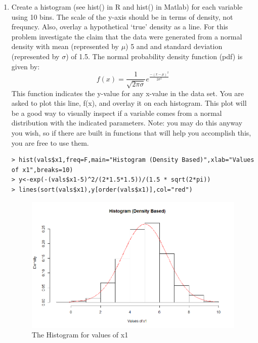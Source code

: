 \documentclass[fontsize=10pt]{scrartcl}
\begin{document}
\begin{enumerate}
\begin{verbatim}
\end{verbatim}
		
		\item
		Create a histogram (see hist() in R and hist() in Matlab) for each variable using 10 bins. The scale of the y-axis should be in terms of density, not frequncy. Also, overlay a hypothetical ‘true’ density as a line. For this problem investigate the claim that the data were generated from a normal density with mean (represented by $\mu$) 5 and and standard deviation (represented by $\sigma$) of 1.5. The normal probability density function (pdf) is given by: \\
		\begin{equation*}
			f(x) = \frac{1}{\sqrt{2\pi\sigma}}e^{\frac{-(x-\mu)^2}{2\sigma^2}}
		\end{equation*}
		This function indicates the y-value for any x-value in the data set. You are asked to plot this line, f(x), and overlay it on each histogram. This plot will be a good way to visually inspect if a variable comes from a normal distribution with the indicated parameters. Note: you may do this anyway you wish, so if there are built in functions that will help you accomplish this, you are free to use them. \\
\begin{verbatim}
> hist(vals$x1,freq=F,main="Histogram (Density Based)",xlab="Values of x1",breaks=10)
> y<-exp(-(vals$x1-5)^2/(2*1.5*1.5))/(1.5 * sqrt(2*pi))
> lines(sort(vals$x1),y[order(vals$x1)],col="red")
\end{verbatim}
		\begin{figure}[H]
			\begin{center}
				\includegraphics[scale=.5]{resources/histogram_q3.png}
				\caption{The Histogram for values of x1}
			\end{center}
		\end{figure}


\end{enumerate}
\end{document}
